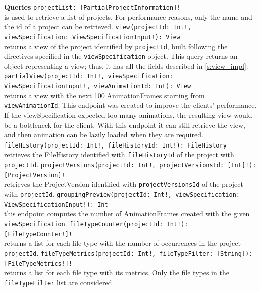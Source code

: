 \textbf{Queries}
\bigbreak
\texttt{projectList:  [PartialProjectInformation]!} \\ 
is used to retrieve a list of projects. For performance reasons, only the name and the id of a project can be retrieved. 
\bigbreak
\texttt{view(projectId: Int!, viewSpecification: ViewSpecificationInput!): View} \\
returns a view of the project identified by \texttt{projectId}, built following the directives specified in the \texttt{viewSpecification} object. 
This query returns an object representing a view; thus, it has all the fields described in \autoref{s:view_impl}. 
\bigbreak
\texttt{partialView(projectId: Int!, viewSpecification: ViewSpecificationInput!, viewAnimationId: Int): View} \\
returns a view with the next 100 AnimationFrames starting from \texttt{viewAnimationId}. 
This endpoint was created to improve the clients' performance. If the viewSpecification expected too many animations, the resulting view would be a bottleneck for the client.
With this endpoint it can still retrieve the view, and then animation can be lazily loaded when they are required. 
\bigbreak
\texttt{fileHistory(projectId: Int!, fileHistoryId: Int!): FileHistory} \\
retrieves the FileHistory identified with \texttt{fileHistoryId} of the project with \texttt{projectId}.
\bigbreak
\texttt{projectVersions(projectId: Int!, projectVersionsId: [Int]!): [ProjectVersion]!} \\
retrieves the ProjectVersion identified with \texttt{projectVersionsId} of the project with \texttt{projectId}.
\bigbreak
\texttt{groupingPreview(projectId: Int!, viewSpecification: ViewSpecificationInput!): Int} \\
this endpoint computes the number of AnimationFrames created with the given \texttt{viewSpecification}.
\bigbreak
\texttt{fileTypeCounter(projectId: Int!): [FileTypeCounter!]!} \\
returns a list for each file type with the number of occurrences in the project \texttt{projectId}.
\bigbreak
\texttt{fileTypeMetrics(projectId: Int!, fileTypeFilter: [String]): [FileTypeMetrics!]!} \\
returns a list for each file type with its metrics. Only the file types in the \texttt{fileTypeFilter} list are considered. 

